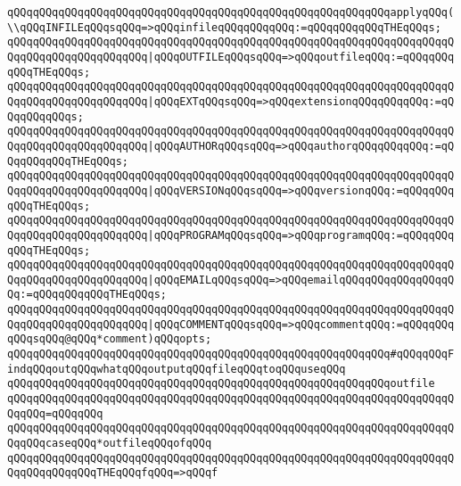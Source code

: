 \newline
\verb|qQQqqQQqqQQqqQQqqQQqqQQqqQQqqQQqqQQqqQQqqQQqqQQqqQQqqQQqqQQqapplyqQQq(\\qQQqINFILEqQQqsqQQq=>qQQqinfileqQQqqQQqqQQq:=qQQqqQQqqQQqTHEqQQqs;|\newline
\verb|qQQqqQQqqQQqqQQqqQQqqQQqqQQqqQQqqQQqqQQqqQQqqQQqqQQqqQQqqQQqqQQqqQQqqQQqqQQqqQQqqQQqqQQqqQQq|\verb#|qQQqOUTFILEqQQqsqQQq=>qQQqoutfileqQQq:=qQQqqQQqqQQqTHEqQQqs;#\newline
\verb|qQQqqQQqqQQqqQQqqQQqqQQqqQQqqQQqqQQqqQQqqQQqqQQqqQQqqQQqqQQqqQQqqQQqqQQqqQQqqQQqqQQqqQQqqQQq|\verb#|qQQqEXTqQQqsqQQq=>qQQqextensionqQQqqQQqqQQq:=qQQqqQQqqQQqs;#\newline
\verb|qQQqqQQqqQQqqQQqqQQqqQQqqQQqqQQqqQQqqQQqqQQqqQQqqQQqqQQqqQQqqQQqqQQqqQQqqQQqqQQqqQQqqQQqqQQq|\verb#|qQQqAUTHORqQQqsqQQq=>qQQqauthorqQQqqQQqqQQq:=qQQqqQQqqQQqTHEqQQqs;#\newline
\verb|qQQqqQQqqQQqqQQqqQQqqQQqqQQqqQQqqQQqqQQqqQQqqQQqqQQqqQQqqQQqqQQqqQQqqQQqqQQqqQQqqQQqqQQqqQQq|\verb#|qQQqVERSIONqQQqsqQQq=>qQQqversionqQQq:=qQQqqQQqqQQqTHEqQQqs;#\newline
\verb|qQQqqQQqqQQqqQQqqQQqqQQqqQQqqQQqqQQqqQQqqQQqqQQqqQQqqQQqqQQqqQQqqQQqqQQqqQQqqQQqqQQqqQQqqQQq|\verb#|qQQqPROGRAMqQQqsqQQq=>qQQqprogramqQQq:=qQQqqQQqqQQqTHEqQQqs;#\newline
\verb|qQQqqQQqqQQqqQQqqQQqqQQqqQQqqQQqqQQqqQQqqQQqqQQqqQQqqQQqqQQqqQQqqQQqqQQqqQQqqQQqqQQqqQQqqQQq|\verb#|qQQqEMAILqQQqsqQQq=>qQQqemailqQQqqQQqqQQqqQQqqQQq:=qQQqqQQqqQQqTHEqQQqs;#\newline
\verb|qQQqqQQqqQQqqQQqqQQqqQQqqQQqqQQqqQQqqQQqqQQqqQQqqQQqqQQqqQQqqQQqqQQqqQQqqQQqqQQqqQQqqQQqqQQq|\verb#|qQQqCOMMENTqQQqsqQQq=>qQQqcommentqQQq:=qQQqqQQqqQQqsqQQq@qQQq*comment)qQQqopts;#\newline
\newline
\verb|qQQqqQQqqQQqqQQqqQQqqQQqqQQqqQQqqQQqqQQqqQQqqQQqqQQqqQQqqQQq#qQQqqQQqFindqQQqoutqQQqwhatqQQqoutputqQQqfileqQQqtoqQQquseqQQq|\newline
\verb|qQQqqQQqqQQqqQQqqQQqqQQqqQQqqQQqqQQqqQQqqQQqqQQqqQQqqQQqqQQqoutfile|\newline
\verb|qQQqqQQqqQQqqQQqqQQqqQQqqQQqqQQqqQQqqQQqqQQqqQQqqQQqqQQqqQQqqQQqqQQqqQQqqQQq=qQQqqQQq|\newline
\verb|qQQqqQQqqQQqqQQqqQQqqQQqqQQqqQQqqQQqqQQqqQQqqQQqqQQqqQQqqQQqqQQqqQQqqQQqqQQqcaseqQQq*outfileqQQqofqQQq|\newline
\verb|qQQqqQQqqQQqqQQqqQQqqQQqqQQqqQQqqQQqqQQqqQQqqQQqqQQqqQQqqQQqqQQqqQQqqQQqqQQqqQQqqQQqTHEqQQqfqQQq=>qQQqf|\newline
